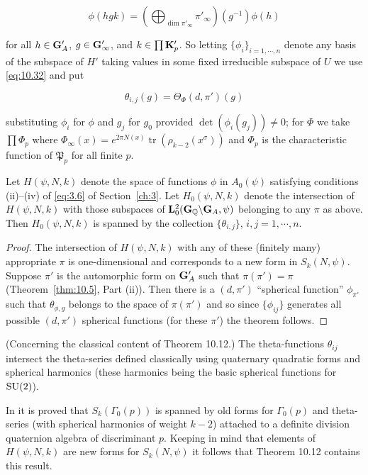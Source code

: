 \[
\phi(hgk) = \left(\bigoplus_{\dim \pi'_\infty} \pi'_\infty\right)(g^{-1})\phi(h)
\]

for all $h \in \mathbf{G}'_A$, $g \in \mathbf{G}'_\infty$, and $k \in \prod \mathbf{K}'_p$. So letting $\{\phi_i\}_{i = 1, \cdots, n}$ denote any basis of the subspace of $H'$ taking values in some fixed irreducible subspace of $U$ we use \eqref{eq:10.32} and put

\[
\theta_{i, j}(g) = \Theta_\Phi(d, \pi')(g)
\]

substituting $\phi_i$ for $\phi$ and $g_j$ for $g_0$ provided $\det(\phi_i(g_j)) \neq 0$; for $\Phi$ we take $\prod \Phi_p$ where $\Phi_\infty(x) = e^{2\pi N(x)}\operatorname{tr}(\rho_{k-2}(x^{\sigma}))$ and $\Phi_p$ is the characteristic function of $\mathfrak{P}_p$ for all finite $p$.

\begin{theorem}\label{thm:10.13}

Let $H(\psi, N, k)$ denote the space of functions $\phi$ in $A_0(\psi)$ satisfying conditions (ii)--(iv) of \eqref{eq:3.6} of Section~\ref{ch:3}. Let $H_0(\psi, N, k)$ denote the intersection of $H(\psi, N, k)$ with those subspaces of $\mathbf{L}_0^2(\mathbf{G}_{\mathbb{Q}} \backslash \mathbf{G}_A, \psi)$ belonging to any $\pi$ as above. Then $H_0(\psi, N, k)$ is spanned by the collection $\{\theta_{i, j}\}$, $i, j = 1, \cdots, n$.

\end{theorem}

\begin{proof}

The intersection of $H(\psi, N, k)$ with any of these (finitely many) appropriate $\pi$ is one-dimensional and corresponds to a new form in $S_k(N, \psi)$. Suppose $\pi'$ is the automorphic form on $\mathbf{G}'_A$ such that $\pi(\pi') = \pi$ (Theorem~\ref{thm:10.5}, Part (ii)). Then there is a $(d, \pi')$ ``spherical function'' $\phi_{\pi'}$ such that $\theta_{\phi, g}$ belongs to the space of $\pi(\pi')$ and so since $\{\phi_{ij}\}$ generates all possible $(d, \pi')$ spherical functions (for these $\pi'$) the theorem follows.

\end{proof}

\begin{remark}\label{rem:10.14}

(Concerning the classical content of Theorem 10.12.) The theta-functions $\theta_{ij}$ intersect the theta-series defined classically using quaternary quadratic forms and spherical harmonics (these harmonics being the basic spherical functions for $\operatorname{SU}(2)$).

In \cite{Eichler3} it is proved that $S_k(\Gamma_0(p))$ is spanned by old forms for $\Gamma_0(p)$ and theta-series (with spherical harmonics of weight $k-2$) attached to a definite division quaternion algebra of discriminant $p$. Keeping in mind that elements of $H(\psi, N, k)$ are new forms for $S_k(N, \psi)$ it follows that Theorem 10.12 contains this result.

\end{remark}

